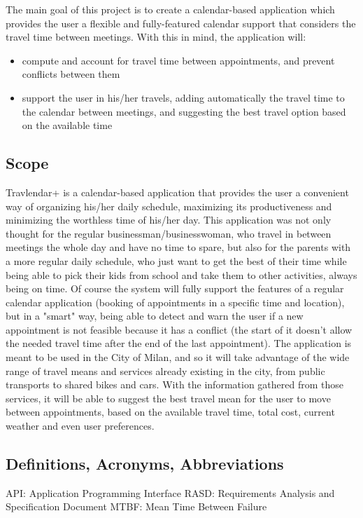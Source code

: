 \documentclass[12pt]{article}
\begin{document}
The main goal of this project is to create a calendar-based application which provides the user a flexible and fully-featured calendar support that considers the travel time between meetings. With this in mind, the application will:
\begin{itemize}
\item compute and account for travel time between appointments, and prevent conflicts between them
\item support the user in his/her travels, adding automatically the travel time to the calendar between meetings, and suggesting the best travel option based on the available time
\end{itemize}

\subsection{Scope}
Travlendar+ is a calendar-based application that provides the user a convenient way of organizing his/her daily schedule, maximizing its productiveness and minimizing the worthless time of his/her day. This application was not only thought for the regular businessman/businesswoman, who travel in between meetings the whole day and have no time to spare, but also for the parents with a more regular daily schedule, who just want to get the best of their time while being able to pick their kids from school and take them to other activities, always being on time.
Of course the system will fully support the features of a regular calendar application (booking of appointments in a specific time and location), but in a "smart" way, being able to detect and warn the user if a new appointment is not feasible because it has a conflict (the start of it doesn't allow the needed travel time after the end of the last appointment). The application is meant to be used in the City of Milan, and so it will take advantage of the wide range of travel means and services already existing in the city, from public transports to shared bikes and cars. With the information gathered from those services, it will be able to suggest the best travel mean for the user to move between appointments, based on the available travel time, total cost, current weather and even user preferences.


\subsection{Definitions, Acronyms, Abbreviations}
API: Application Programming Interface
RASD: Requirements Analysis and Specification Document
MTBF: Mean Time Between Failure
\end{document}

